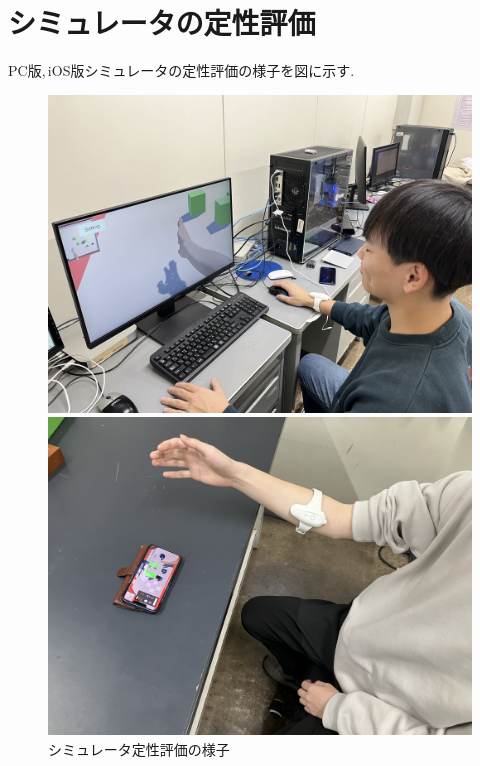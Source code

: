 \documentclass{ltjsreport}
\begin{document}
	\section{シミュレータの定性評価}
		PC版,\,iOS版シミュレータの定性評価の様子を図に示す.
		\begin{figure}[H]
		\centering
		\begin{minipage}{0.4\columnwidth}
		\centering
		\includegraphics[width = \columnwidth]{../figs/IMG_5132.JPG}
		\end{minipage}
		\hspace{0.04\columnwidth}
		\begin{minipage}{0.4\columnwidth}
		\centering
		\includegraphics[width = \columnwidth]{../figs/IMG_6323.jpg}
		\end{minipage}
		\caption{シミュレータ定性評価の様子}
		\label{fig:simuraterimage}
		\end{figure}
		\vspace{-15pt}
\end{document}
